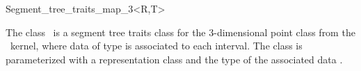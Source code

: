 \begin{ccRefClass} {Segment_tree_traits_map_3<R,T>}

\ccDefinition
The class \ccClassName\ is a segment tree traits class for the 3-dimensional
point class from the \cgal\ kernel,  where data of
type  is associated to each interval.
The class is parameterized with a representation class  and the type of
the associated data .


\ccTypes
{}


\end{ccRefClass} 

